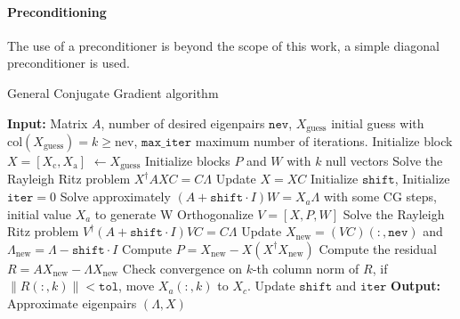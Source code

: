 \paragraph{Preconditioning} The use of a preconditioner is beyond the scope of this work, a simple diagonal preconditioner is used.
\begin{algorithm}[H]
\caption{General Conjugate Gradient algorithm}
\begin{algorithmic}[1]
    \label{alg:mod_gcg}
\STATE \textbf{Input:} Matrix \(A\), number of desired eigenpairs \( \texttt{nev} \), $X_\text{guess}$ initial guess with $\text{col}(X_\text{guess}) = k \ge \text{nev}$, \(\texttt{max\_iter}\) maximum number of iterations.
\STATE Initialize block $X=[X_\text{c}, X_\text{a}]$ $\gets X_\text{guess}$
\STATE Initialize blocks \( P \) and \( W \) with \( k \) null vectors
\STATE Solve the Rayleigh Ritz problem \(X^\dagger A X C= C \Lambda \)
\STATE Update \(X=X C\)
\STATE Initialize $\texttt{shift}$, Initialize $\texttt{iter} = 0$ 
    \STATE Solve approximately \( (A+ \texttt{shift}\cdot I)W = X_a\Lambda \) with some CG steps, initial value $X_a$ to generate W
    \STATE Orthogonalize \( V=[X, P, W] \)
    \STATE Solve the Rayleigh Ritz problem \(V^\dagger (A + \texttt{shift}\cdot I) V C= C\Lambda \)
    \STATE Update \(X_\text{new} = (V C)(:, \texttt{nev})\) and \(\Lambda_\text{new} = \Lambda - \texttt{shift}\cdot I\)
    \STATE Compute \(P=X_\text{new} - X(X^\dagger X_\text{new})\)
    \STATE Compute the residual \( R = AX_\text{new} - \Lambda X_\text{new} \) 
    \STATE Check convergence on $k$-th column norm of \(R\), if $\|R(:, k)\| < \texttt{tol}$, move \(X_a(:, k)\) to \(X_c\).
    \STATE Update $\texttt{shift}$ and $\texttt{iter}$
\ENDWHILE
\STATE \textbf{Output:} Approximate eigenpairs \( (\Lambda, X) \)
\end{algorithmic}
\end{algorithm}


